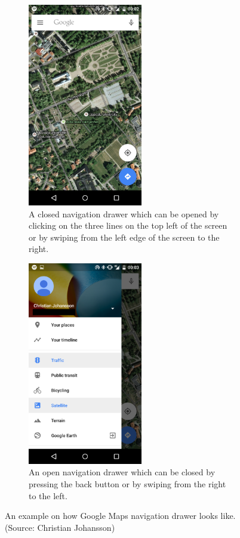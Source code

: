 \documentclass[12pt,a4paper,notitlepage]{report}
\begin{document}
\begin{figure}[htb!]
\centering
\begin{subfigure}{.45\textwidth}
  \centering
  \includegraphics[width=50mm]{images/no_nav_drawer.png}
  \caption{A closed navigation drawer which can be opened by clicking on the three lines on the top left of the screen or by swiping from the left edge of the screen to the right.}
\end{subfigure}\hfill
\begin{subfigure}{.45\textwidth}
  \centering
  \includegraphics[width=50mm]{images/nav_drawer.png}
  \caption{An open navigation drawer which can be closed by pressing the back button or by swiping from the right to the left.}
\end{subfigure}
\caption[Navigation drawer example]{An example on how Google Maps navigation drawer looks like. (Source: Christian Johansson)}
\label{fig:example_nav_drawer}
\end{figure}
\end{document}
